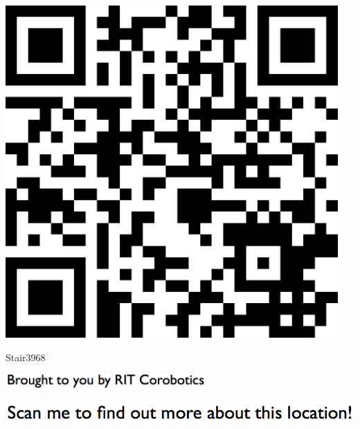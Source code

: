 \documentclass[letterpaper]{article}
\begin{document}
 \begingroup 
 \centerline{\includegraphics[scale=1,width=5in,height=5in]{Stair3968.png}} 
 \endgroup 
 \vspace*{\fill} 

 \hfill{\small Stair3968} 

  \vspace{0.7in} 
 
 \centerline{\includegraphics[scale=1,width=3in]{text-bottom.png}} 
 
 \pagebreak 
{} 
 \vspace*{\fill} 
 
  \centerline{\includegraphics[scale=1,width=6in]{text-top.png}} 
 
 \vspace{0.5in} 
 
\end{document}
